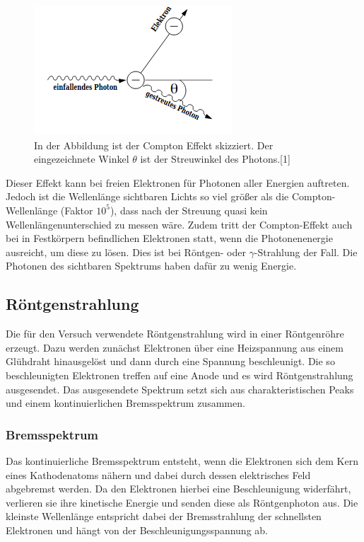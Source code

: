 \documentclass[titlepage = firstcover]{scrartcl}
\begin{document}
        \FloatBarrier
        \begin{figure}[h]
            \centering
            \includegraphics{SkizzeCompton.png}
            \caption{In der Abbildung ist der Compton Effekt skizziert. Der eingezeichnete Winkel $\theta$ ist der Streuwinkel des Photons.[1]}
            \label{fig:SkizzeCompton}
        \end{figure}
        \FloatBarrier

        \noindent
        Dieser Effekt kann bei freien Elektronen für Photonen aller Energien auftreten. Jedoch ist die Wellenlänge sichtbaren Lichts so viel größer
        als die Compton-Wellenlänge (Faktor $10^5$), dass nach der Streuung quasi kein Wellenlängenunterschied zu messen wäre. Zudem tritt der Compton-Effekt
        auch bei in Festkörpern befindlichen Elektronen statt, wenn die Photonenenergie ausreicht, um diese zu lösen. Dies ist bei Röntgen- oder $\gamma$-Strahlung
        der Fall. Die Photonen des sichtbaren Spektrums haben dafür zu wenig Energie.

        \subsection{Röntgenstrahlung}
        Die für den Versuch verwendete Röntgenstrahlung wird in einer Röntgenröhre erzeugt. Dazu werden zunächst Elektronen über eine Heizspannung aus einem
        Glühdraht hinausgelöst und dann durch eine Spannung beschleunigt. Die so beschleunigten Elektronen treffen auf eine Anode und es wird Röntgenstrahlung
        ausgesendet. Das ausgesendete Spektrum setzt sich aus charakteristischen Peaks und einem kontinuierlichen Bremsspektrum zusammen. 
        
            \subsubsection*{Bremsspektrum}
                Das kontinuierliche Bremsspektrum entsteht, wenn die Elektronen sich dem Kern eines Kathodenatoms nähern und dabei durch dessen elektrisches 
                Feld abgebremst werden. Da den Elektronen hierbei eine Beschleunigung widerfährt, verlieren sie ihre kinetische Energie und senden diese als 
                Röntgenphoton aus. Die kleinste Wellenlänge entspricht dabei der Bremsstrahlung der schnellsten Elektronen und hängt von der 
                Beschleunigungsspannung ab.
                
\end{document}
